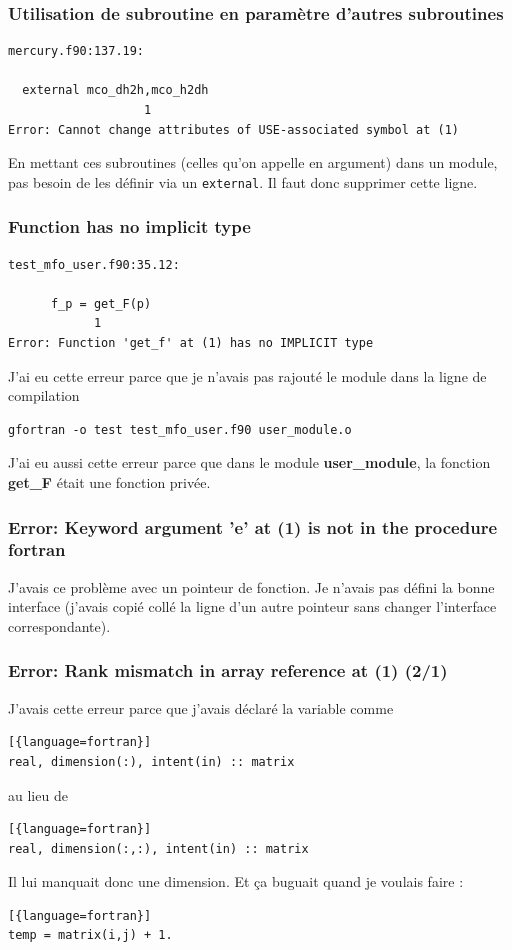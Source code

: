 \documentclass[a4paper,twoside]{article}
\begin{document}
\subsubsection{Utilisation de subroutine en paramètre d'autres subroutines}
\begin{verbatim}
mercury.f90:137.19:

  external mco_dh2h,mco_h2dh
                   1
Error: Cannot change attributes of USE-associated symbol at (1)
\end{verbatim}

En mettant ces subroutines (celles qu'on appelle en argument) dans un module, pas besoin de les définir via un \texttt{external}. Il faut donc supprimer cette ligne.

\subsubsection{Function has no implicit type}
\begin{verbatim}
test_mfo_user.f90:35.12:

      f_p = get_F(p)
            1
Error: Function 'get_f' at (1) has no IMPLICIT type
\end{verbatim}

J'ai eu cette erreur parce que je n'avais pas rajouté le module dans la ligne de compilation 
\begin{verbatim}
gfortran -o test test_mfo_user.f90 user_module.o
\end{verbatim}

\bigskip

J'ai eu aussi cette erreur parce que dans le module \textbf{user\_module}, la fonction \textbf{get\_F} était une fonction privée.

\subsubsection{Error: Keyword argument 'e' at (1) is not in the procedure fortran}
J'avais ce problème avec un pointeur de fonction. Je n'avais pas défini la bonne interface (j'avais copié collé la ligne d'un
autre pointeur sans changer l'interface correspondante). 

\subsubsection{Error: Rank mismatch in array reference at (1) (2/1)}
J'avais cette erreur parce que j'avais déclaré la variable comme 
\begin{lstlisting}[{language=fortran}]
real, dimension(:), intent(in) :: matrix
\end{lstlisting}
au lieu de
\begin{lstlisting}[{language=fortran}]
real, dimension(:,:), intent(in) :: matrix
\end{lstlisting}
Il lui manquait donc une dimension. Et ça buguait quand je voulais faire :
\begin{lstlisting}[{language=fortran}]
temp = matrix(i,j) + 1.
\end{lstlisting}
\end{document}
